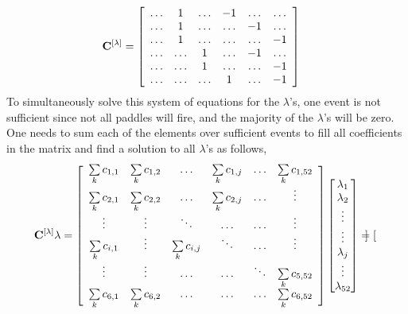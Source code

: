 \documentclass[14pt]{article}
\begin{document}
\begin{itemize}
\begin{align}
\bf{C^{[\lambda]}} &= \left[\begin{array}{cccccc}
  \hdots & 1 & \hdots & -1 & \hdots & \hdots \\
  \hdots & 1 & \hdots & \hdots & -1 & \hdots \\
  \hdots & 1 & \hdots & \hdots & \hdots & -1  \\
  \hdots & \hdots & 1 & \hdots & -1 & \hdots \\
  \hdots & \hdots & 1 & \hdots & \hdots & -1 \\
  \hdots & \hdots & \hdots & 1 & \hdots & -1 
  \end{array}\right]
\end{align}
\newpage
To simultaneously solve this system of equations for the $\lambda$'s, one event
is not sufficient since not all paddles will fire, and the majority of the $\lambda$'s
will be zero. One needs to sum each of the elements over sufficient events to fill all
coefficients in the matrix and find a solution to all $\lambda$'s as follows,
\begin{align}
\bf{C^{[\lambda]}}\lambda &= \left[\begin{array}{cccccc}
  \sum\limits_{k} c_{1,1} & \sum\limits_{k}c_{1,2} & \hdots & \sum\limits_{k}c_{1,j} & \hdots & \sum\limits_{k}c_{1,52} \\
  \sum\limits_{k}c_{2,1} & \sum\limits_{k}c_{2,2} & \hdots & \sum\limits_{k}c_{2,j} & \hdots & \vdots \\
    \vdots & \vdots & \ddots & \hdots & \hdots & \vdots \\
  \sum\limits_{k}c_{i,1} & \vdots &  \sum\limits_{k}c_{i,j} & \ddots & \hdots & \vdots \\
    \vdots & \vdots & \hdots & \hdots & \ddots &  \sum\limits_{k}c_{5,52} \\
     \sum\limits_{k}c_{6,1} &  \sum\limits_{k}c_{6,2} & \hdots & \hdots & \hdots &  \sum\limits_{k}c_{6,52} \\
  \end{array}\right]
\begin{bmatrix}
  \lambda_{1}  \\
  \lambda_{2}  \\
  \vdots \\
  \vdots \\
  \lambda_{j} \\
  \vdots \\
  \lambda_{52}
\end{bmatrix} 
= \begin{bmatrix}

\end{bmatrix}
\end{align}
\end{itemize}
\end{document}

